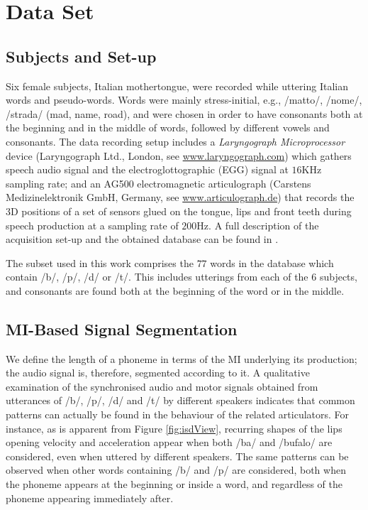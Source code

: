 \section{Data Set}
\label{sec:dataset}

\subsection{Subjects and Set-up}
\label{subsec:setup}


Six female subjects, Italian mothertongue, were recorded while uttering
Italian words and pseudo-words. Words were mainly stress-initial, e.g.,
/matto/, /nome/, /strada/ (mad, name, road), and were chosen in order
to have consonants both at the beginning and in the middle of
words, followed by different vowels and consonants.
The data recording setup includes a \emph{Laryngograph Microprocessor}
device (Laryngograph Ltd., London, see \url{www.laryngograph.com}) which gathers speech audio
signal and the electroglottographic (EGG) signal at $16$KHz sampling
rate; and an AG500 electromagnetic articulograph (Carstens Medizinelektronik
GmbH, Germany, see \url{www.articulograph.de}) that records the
3D positions of a set of sensors glued on the tongue, lips and front teeth
during speech production at a sampling rate of $200$Hz. A full description of the 
acquisition set-up and the obtained database can be found in \cite{tavella}.

The subset used in this work comprises the $77$ words in the database
which contain /b/, /p/, /d/ or /t/. This includes utterings from each of the
$6$ subjects, and consonants are found both at the beginning of the word or
in the middle.

\subsection{MI-Based Signal Segmentation}
\label{subsec:segm}

We define the length of a phoneme in terms of the MI underlying its production;
the audio signal is, therefore, segmented according to it.
A qualitative examination of the synchronised audio and motor
signals obtained from utterances of /b/, /p/, /d/ and /t/
by different speakers indicates that common patterns can
actually be found in the behaviour of the related articulators.
For instance, as is apparent from Figure \ref{fig:isdView}, 
recurring shapes of the lips opening velocity and acceleration appear
when both /ba/ and /bufalo/ are considered, even when uttered by different
speakers. The same patterns can be observed when other words containing
/b/ and /p/ are considered, both when the phoneme appears at the beginning
or inside a word, and regardless of the phoneme appearing immediately after.

